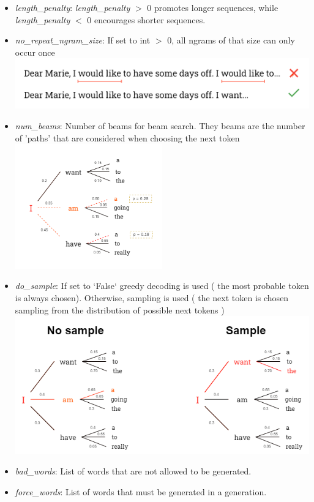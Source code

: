 \documentclass{article}
\begin{document}
\begin{itemize}
    \item \textit{length\_penalty}: \textit{length\_penalty} $>$ 0 promotes longer sequences, while \linebreak 
    \textit{length\_penalty} $<$ 0 encourages shorter sequences.
    \item \textit{no\_repeat\_ngram\_size}: If set to int $>$ 0, all ngrams of that size can only occur once \\
    \includegraphics[width=\textwidth]{no_ngram_thesis.drawio.png}
    \item \textit{num\_beams}: Number of beams for beam search. They beams are the number of 'paths' that are considered when choosing the next token \\
    \includegraphics[width=0.5\textwidth]{num_beams.drawio.png}
    \item \textit{do\_sample}: If set to `False` greedy decoding is used ( the most probable token is always chosen). Otherwise, sampling is used ( the next token is chosen sampling from the distribution of possible next tokens )
    \includegraphics[width=\textwidth]{do_sample.drawio.png}
    \item \textit{bad\_words}: List of words that are not allowed to be generated.
    \item \textit{force\_words}: List of words that must be generated in a generation.
    
\end{itemize}
\end{document}
